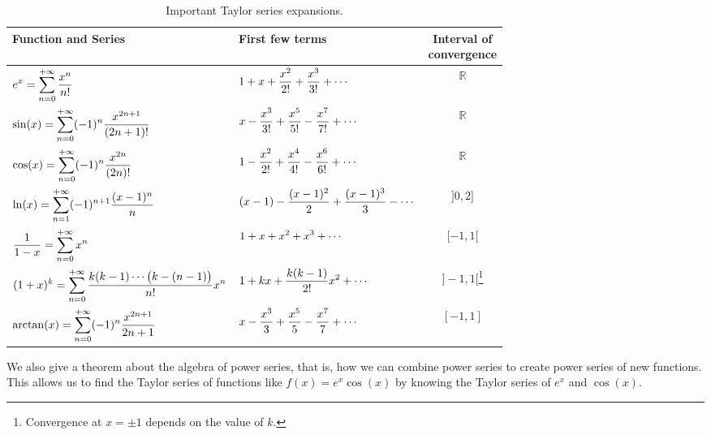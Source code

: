 \begin{table}
\caption{Important Taylor series expansions.}
\label{idea:common_taylor}
\begin{tabular}{l|l|c}
Function and Series & First few terms & \parbox{50pt}{\centering Interval of\\convergence} \\\hline
\rule{0pt}{25pt}$\displaystyle e^x = \sum_{n=0}^{+\infty} \frac{x^n}{n!}$ & $\displaystyle 1+ x+\frac{x^2}{2!} + \frac{x^3}{3!}+\cdots$ & $\mathbb{R} $\\
\rule{0pt}{25pt}$\displaystyle \sin(x) = \sum_{n=0}^{+\infty} (-1)^n\frac{x^{2n+1}}{(2n+1)!}$ & $\displaystyle x-\frac{x^3}{3!}+\frac{x^5}{5!} - \frac{x^7}{7!}+\cdots$ & $\mathbb{R}$\\
\rule{0pt}{25pt}$\displaystyle \cos(x) = \sum_{n=0}^{+\infty} (-1)^n\frac{x^{2n}}{(2n)!}$ & $\displaystyle 1-\frac{x^2}{2!}+\frac{x^4}{4!} - \frac{x^6}{6!} +\cdots$ & $\mathbb{R}$\\
\rule{0pt}{25pt}$\displaystyle \ln(x) = \sum_{n=1}^{+\infty}(-1)^{n+1}\frac{(x-1)^n}{n}$ & $\displaystyle (x-1)- \frac{(x-1)^2}{2} +\frac{(x-1)^3}{3}-\cdots$& $]0,2]$\\
\rule{0pt}{25pt}$\displaystyle \frac{1}{1-x} = \sum_{n=0}^{+\infty} x^n$ &$\displaystyle 1+x+x^2+x^3+\cdots$& $[-1,1[$\\
\rule{0pt}{25pt}$\displaystyle (1+x)^k=\sum_{n=0}^{+\infty} \frac{k(k-1)\cdots\big(k-(n-1)\big)}{n!}x^n$ & $\displaystyle 1+kx+\frac{k(k-1)}{2!}x^2 + \cdots$ & $]-1,1[$\footnote{Convergence at $x=\pm1$ depends on the value of $k$.}\\
\rule{0pt}{25pt}$\displaystyle \arctan(x) = \sum_{n=0}^{+\infty} (-1)^n\frac{x^{2n+1}}{2n+1}$ & $\displaystyle x-\frac{x^3}{3}+\frac{x^5}{5}-\frac{x^7}{7}+\cdots$ & $[-1,1]$\\
\end{tabular}
\end{table}

We also give a theorem about the algebra of power series, that is, how we can combine power series to create power series of new functions. This allows us to find the Taylor series of functions like $f(x) = e^x\cos (x)$ by knowing the Taylor series of $e^x$ and $\cos (x)$.


	\checkoddpage
{}

